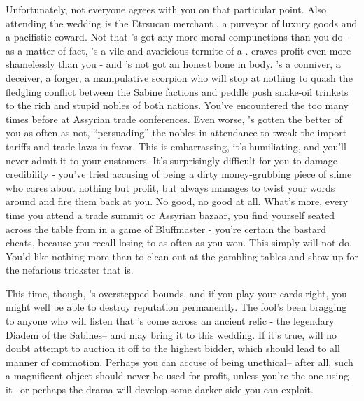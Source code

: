 \documentclass[char]{Kos}
\begin{document}
Unfortunately, not everyone agrees with you on that particular point. Also attending the wedding is the Etrsucan merchant \cMerchant{}, a purveyor of luxury goods and a pacifistic coward. Not that \cMerchant{}'s got any more moral compunctions than you do - as a matter of fact, \cMerchant{\they}'s a vile and avaricious termite of a \cMerchant{\human}. \cMerchant{\They} craves profit even more shamelessly than you - and \cMerchant{\they}'s not got an honest bone in \cMerchant{\their} body. \cMerchant{\They}'s a conniver, a deceiver, a forger, a manipulative scorpion who will stop at nothing to quash the fledgling conflict between the Sabine factions and peddle \cMerchant{\their} posh snake-oil trinkets to the rich and stupid nobles of both nations. You've encountered the \cMerchant{\human} too many times before at Assyrian trade conferences. Even worse, \cMerchant{\they}'s gotten the better of you as often as not, ``persuading'' the nobles in attendance to tweak the import tariffs and trade laws in \cMerchant{\their} favor. This is embarrassing, it's humiliating, and you'll never admit it to your customers. It's surprisingly difficult for you to damage \cMerchant{\their} credibility - you've tried accusing \cMerchant{\them} of being a dirty money-grubbing piece of slime who cares about nothing but profit, but \cMerchant{\they} always manages to twist your words around and fire them back at you. No good, no good at all. What's more, every time you attend a trade summit or Assyrian bazaar, you find yourself seated across the table from \cMerchant{\them} in a game of Bluffmaster - you're certain the bastard cheats, because you recall losing to \cMerchant{\them} as often as you won. This simply will not do. You'd like nothing more than to clean \cMerchant{} out at the gambling tables and show \cMerchant{\them} up for the nefarious trickster that \cMerchant{\they} is.

This time, though, \cMerchant{}'s overstepped \cMerchant{\their} bounds, and if you play your cards right, you might well be able to destroy \cMerchant{\their} reputation permanently. The fool's been bragging to anyone who will listen that \cMerchant{\they}'s come across an ancient relic - the legendary Diadem of the Sabines-- and may bring it to this wedding. If it's true, \cMerchant{\they} will no doubt attempt to auction it off to the highest bidder, which should lead to all manner of commotion. Perhaps you can accuse \cMerchant{\them} of being unethical-- after all, such a magnificent object should never be used for profit, unless you're the one using it-- or perhaps the drama will develop some darker side you can exploit.
\end{document}
